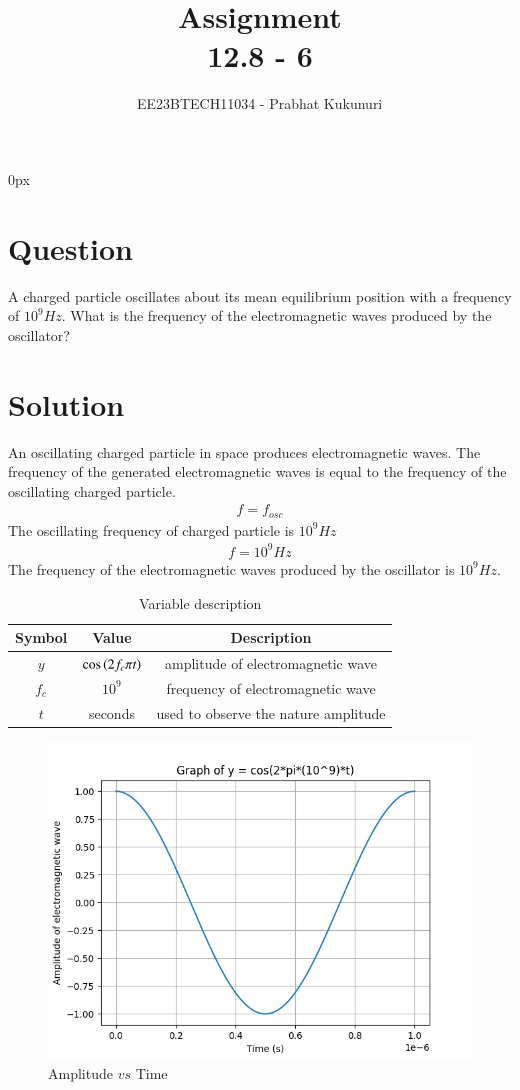 \documentclass[journal,12pt,twocolumn]{IEEEtran}
\theoremstyle{remark}
\begin{document}
\parindent 0px


\title{Assignment\\[1ex]12.8 - 6}
\author{EE23BTECH11034 - Prabhat Kukunuri$^{}$%
}
\maketitle
\newpage
\bigskip

\renewcommand{\thefigure}{\theenumi}
\renewcommand{\thetable}{\theenumi}
\section*{Question}
A charged particle oscillates about its mean equilibrium position with a frequency of $10^9Hz$. What is the frequency of the electromagnetic waves produced by the oscillator?

\section*{Solution}
An oscillating charged particle in space produces electromagnetic waves. The frequency of the generated electromagnetic waves is equal to the frequency of the oscillating charged particle.
\begin{align}
    f = f_{osc}
\end{align}
The oscillating frequency of charged particle is $10^9Hz$
\begin{align}
    f = 10^9Hz
\end{align}
The frequency of the electromagnetic waves produced by the oscillator is $10^9Hz$.

\begin{table}[h]
    \centering
    \begin{tabular}{|c|c|c|}
    \hline
   Symbol&Value&Description\\ \hline
   $y$&$\cos\left(2f_c{\pi}t\right)$&amplitude of electromagnetic wave\\ \hline
   $f_c$&$10^9$&frequency of electromagnetic wave\\ \hline
   $t$&seconds&used to observe the nature amplitude\\ \hline

    \end{tabular}
    \caption{Variable description}
    \label{tab:12.8.6.1}
\end{table}

\begin{figure}[h]
    \centering
    \includegraphics[width=\columnwidth]{Figure__1.png}
    \caption{Amplitude $vs$ Time}
    \label{fig:12.8.6.2}
\end{figure}
\end{document}
